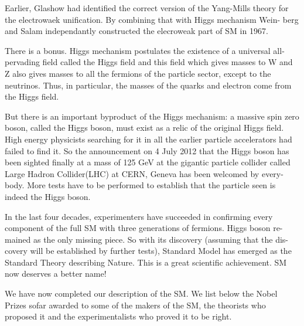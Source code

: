 Earlier, Glashow had identified the correct version of the Yang-Mills theory
for the electrowaek unification. By combining that with Higgs mechanism Wein-
berg and Salam independantly constructed the elecroweak part of SM in 1967.


There is a bonus. Higgs mechanism postulates the existence of a universal
all-pervading field called the Higgs field and this field which gives masses to W
and Z also gives masses to all the fermions of the particle sector, except to the
neutrinos. Thus, in particular, the masses of the quarks and electron come from
the Higgs field.


But there is an important byproduct of the Higgs mechanism: a massive spin
zero boson, called the Higgs boson, must exist as a relic of the original Higgs
field. High energy physicists searching for it in all the earlier particle accelerators
had failed to find it. So the announcement on 4 July 2012 that the Higgs boson has
been sighted finally at a mass of 125 GeV at the gigantic particle collider called
Large Hadron Collider(LHC) at CERN, Geneva has been welcomed by every-
body. More tests have to be performed to establish that the particle seen is indeed
the Higgs boson.


In the last four decades, experimenters have succeeded in confirming every
component of the full SM with three generations of fermions. Higgs boson re-
mained as the only missing piece. So with its discovery (assuming that the dis-
covery will be established by further tests), Standard Model has emerged as the
Standard Theory describing Nature. This is a great scientific achievement. SM
now deserves a better name!


We have now completed our description of the SM. We list below the Nobel
Prizes sofar awarded to some of the makers of the SM, the theorists who proposed
it and the experimentalists who proved it to be right.

{\fontsize{6}{8}}

